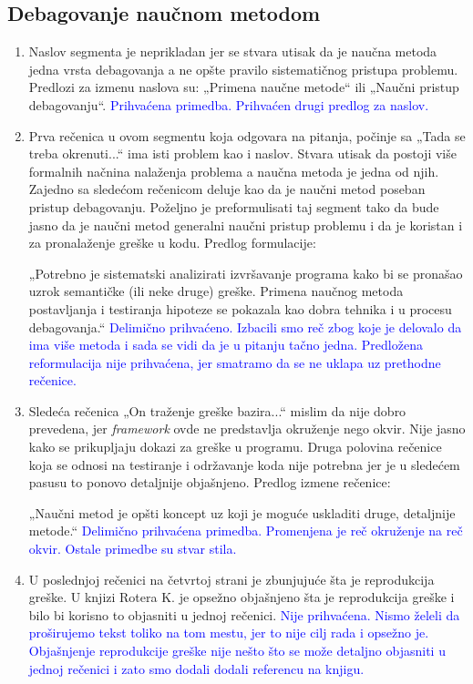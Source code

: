 \documentclass[a4paper]{report}
\newcommand{\odgovor}[1]{\textcolor{blue}{#1}}
\begin{document}
\subsection{Debagovanje naučnom metodom}
\begin{enumerate}
    \item Naslov segmenta je neprikladan jer se stvara utisak da je naučna metoda jedna vrsta debagovanja a ne opšte pravilo sistematičnog pristupa problemu. Predlozi za izmenu naslova su:
    „Primena naučne metode“ ili „Naučni pristup debagovanju“.
    \odgovor{Prihvaćena primedba. Prihvaćen drugi predlog za naslov.}
    \item Prva rečenica u ovom segmentu koja odgovara na pitanja, počinje sa „Tada se treba okrenuti...“ ima isti problem kao i naslov. Stvara utisak da postoji više formalnih načnina nalaženja problema a naučna metoda je jedna od njih. Zajedno sa sledećom rečenicom deluje kao da je naučni metod poseban pristup debagovanju. Poželjno je preformulisati taj segment tako da bude jasno da je naučni metod generalni naučni pristup problemu i da je koristan i za pronalaženje greške u kodu. Predlog formulacije:
    
    „Potrebno je sistematski analizirati izvršavanje programa kako bi se pronašao uzrok semantičke (ili neke druge) greške. Primena naučnog metoda postavljanja i testiranja hipoteze se pokazala kao dobra tehnika i u procesu debagovanja.“
    \odgovor{Delimično prihvaćeno. Izbacili smo reč zbog koje je delovalo da ima više metoda i sada se vidi da je u pitanju tačno jedna. Predložena reformulacija nije prihvaćena, jer smatramo da se ne uklapa uz prethodne rečenice. }
    \item Sledeća rečenica „On traženje greške bazira...“ mislim da nije dobro prevedena, jer \emph{framework} ovde ne predstavlja okruženje nego okvir. Nije jasno kako se prikupljaju dokazi za greške u programu. Druga polovina rečenice koja se odnosi na testiranje i održavanje koda nije potrebna jer je u sledećem pasusu to ponovo detaljnije objašnjeno. Predlog izmene rečenice:
    
    „Naučni metod je opšti koncept uz koji je moguće uskladiti druge, detaljnije metode.“
    \odgovor{Delimično prihvaćena primedba. Promenjena je reč okruženje na reč okvir. Ostale primedbe su stvar stila.}
    \item U poslednjoj rečenici na četvrtoj strani je zbunjujuće šta je reprodukcija greške. U knjizi Rotera K. je opsežno objašnjeno šta je reprodukcija greške i bilo bi korisno to objasniti u jednoj rečenici.
    \odgovor{Nije prihvaćena. Nismo želeli da proširujemo tekst toliko na tom mestu, jer to nije cilj rada i opsežno je. Objašnjenje reprodukcije greške nije nešto što se može detaljno objasniti u jednoj rečenici i zato smo dodali dodali referencu na knjigu.}
\end{enumerate}
\end{document}

